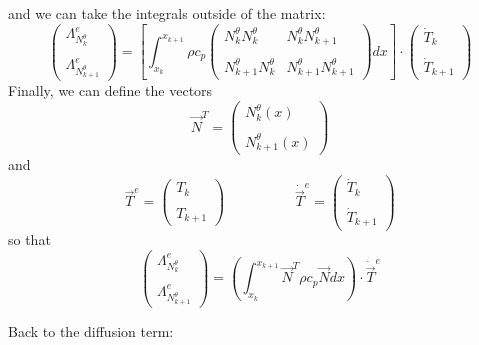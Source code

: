 and we can take the integrals outside of the matrix:
\[
\left(
\begin{array}{c}
{\Lambda}_{N_k^\theta}^e \\ \\ {\Lambda}_{N_{k+1}^\theta}^e
\end{array}
\right)
=
\left[
\int_{x_k}^{x_{k+1}}
\rho c_p
\left(
\begin{array}{cc}
N_k^\theta N_{k}^\theta     &  N_k^\theta N_{k+1}^\theta  \\ \\
N_{k+1}^\theta N_{k}^\theta &  N_{k+1}^\theta N_{k+1}^\theta 
\end{array}
\right)
dx
\right]
\cdot
\left(
\begin{array}{c}
\dot{T}_k \\ \\ 
\dot{T}_{k+1}
\end{array}
\right)
\]
Finally, we can define the vectors 
\[
{\vec N}^T = 
\left(
\begin{array}{c}
N_k^\theta(x)  \\ \\  N_{k+1}^\theta (x)
\end{array}
\right)
\]
and 
\[
{\vec T}^e = 
\left(
\begin{array}{c}
T_k \\ \\ T_{k+1}
\end{array}
\right)
\quad
\quad
\quad
\quad
\quad
\dot{\vec T}^e = 
\left(
\begin{array}{c}
\dot{T}_k \\ \\ \dot{T}_{k+1}
\end{array}
\right)
\]
so that 
\[
\left(
\begin{array}{c}
{\Lambda}_{N_k^\theta}^e \\  \\ {\Lambda}_{N_{k+1}^\theta}^e
\end{array}
\right)
=
\left( \int_{x_k}^{x_{k+1}}   {\vec N}^T \rho c_p  {\vec N} dx  \right) \cdot \dot{\vec T}^e
\]

Back to the diffusion term:

